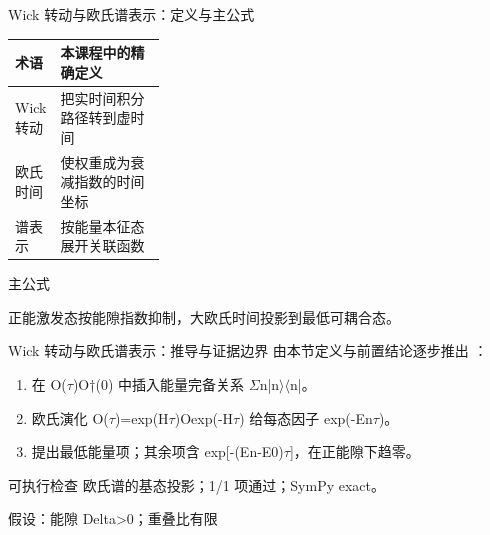 \begin{frame}[t]{Wick 转动与欧氏谱表示：定义与主公式}
\footnotesize\begin{tabularx}{\linewidth}{p{0.30\linewidth}Y}
\toprule 术语 & 本课程中的精确定义\\\midrule
{} Wick 转动 & 把实时间积分路径转到虚时间\\
 欧氏时间 & 使权重成为衰减指数的时间坐标\\
 谱表示 & 按能量本征态展开关联函数\\
\bottomrule\end{tabularx}\vspace{0.15cm}
\begin{block}{ 主公式}\centering{}\end{block}
正能激发态按能隙指数抑制，大欧氏时间投影到最低可耦合态。
\end{frame}

\begin{frame}[t]{Wick 转动与欧氏谱表示：推导与证据边界}
\footnotesize
{}\quad 由本节定义与前置结论逐步推出 ：
\begin{enumerate}
\item 在 O(\ensuremath{\tau})O†(0) 中插入能量完备关系 \ensuremath{\Sigma}n|n\ensuremath{\rangle}\ensuremath{\langle}n|。
\item 欧氏演化 O(\ensuremath{\tau})=exp(H\ensuremath{\tau})Oexp(-H\ensuremath{\tau}) 给每态因子 exp(-En\ensuremath{\tau})。
\item 提出最低能量项；其余项含 exp[-(En-E0)\ensuremath{\tau}]，在正能隙下趋零。
\end{enumerate}\begin{block}{可执行检查}
\quad 欧氏谱的基态投影；1/1 项通过；SymPy exact。
\par\scriptsize 假设：能隙 Delta>0；重叠比有限
\end{block}
\end{frame}

